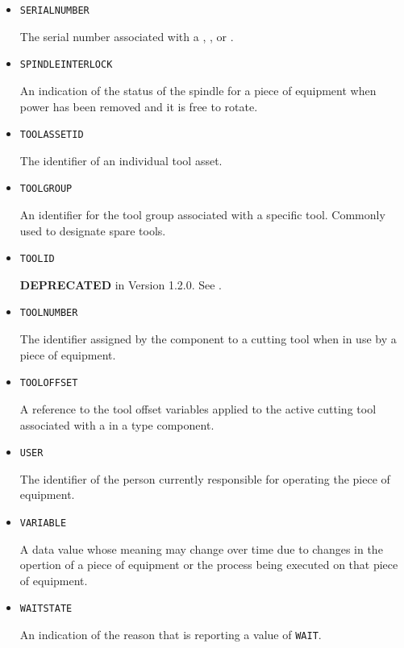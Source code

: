 \begin{itemize}
\item \texttt{SERIAL\textunderscore NUMBER}  

The serial number associated with a , , or .


\item \texttt{SPINDLE\textunderscore INTERLOCK}  

An indication of the status of the spindle for a piece of equipment when power has been removed and it is free to rotate.


\item \texttt{TOOL\textunderscore ASSET\textunderscore ID}  

The identifier of an individual tool asset.


\item \texttt{TOOL\textunderscore GROUP}  

An identifier for the tool group associated with a specific tool. Commonly used to designate spare tools.


\item \texttt{TOOL\textunderscore ID}  

\textbf{DEPRECATED} in Version 1.2.0.   See .


\item \texttt{TOOL\textunderscore NUMBER}  

The identifier assigned by the  component to a cutting tool when in use by a piece of equipment.


\item \texttt{TOOL\textunderscore OFFSET}  

A reference to the tool offset variables applied to the active cutting tool associated with a  in a  type component.


\item \texttt{USER}  

The identifier of the person currently responsible for operating the piece of equipment.


\item \texttt{VARIABLE}  

A data value whose meaning may change over time due to changes in the opertion of a piece of equipment or the process being executed on that piece of equipment.


\item \texttt{WAIT\textunderscore STATE}  

An indication of the reason that  is reporting a value of \texttt{WAIT}.



\end{itemize}
